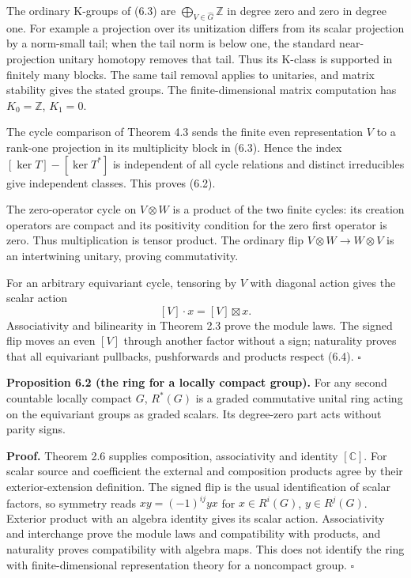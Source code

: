 \documentclass[
  11pt,
]{article}
\begin{document}
The ordinary K-groups of (6.3) are
\(\bigoplus_{V\in\widehat G}\mathbb Z\) in degree zero and zero in
degree one. For example a projection over its unitization differs from
its scalar projection by a norm-small tail; when the tail norm is below
one, the standard near-projection unitary homotopy removes that tail.
Thus its K-class is supported in finitely many blocks. The same tail
removal applies to unitaries, and matrix stability gives the stated
groups. The finite-dimensional matrix computation has \(K_0=\mathbb Z\),
\(K_1=0\).

The cycle comparison of Theorem 4.3 sends the finite even representation
\(V\) to a rank-one projection in its multiplicity block in (6.3). Hence
the index \([\ker T]-[\ker T^*]\) is independent of all cycle relations
and distinct irreducibles give independent classes. This proves (6.2).

The zero-operator cycle on \(V\otimes W\) is a product of the two finite
cycles: its creation operators are compact and its positivity condition
for the zero first operator is zero. Thus multiplication is tensor
product. The ordinary flip \(V\otimes W\to W\otimes V\) is an
intertwining unitary, proving commutativity.

For an arbitrary equivariant cycle, tensoring by \(V\) with diagonal
action gives the scalar action \[
[V]\cdot x=[V]\boxtimes x.
\tag{6.4}
\] Associativity and bilinearity in Theorem 2.3 prove the module laws.
The signed flip moves an even \([V]\) through another factor without a
sign; naturality proves that all equivariant pullbacks, pushforwards and
products respect (6.4). \(\square\)

\textbf{Proposition 6.2 (the ring for a locally compact group).} For any
second countable locally compact \(G\), \(R^*(G)\) is a graded
commutative unital ring acting on the equivariant groups as graded
scalars. Its degree-zero part acts without parity signs.

\textbf{Proof.} Theorem 2.6 supplies composition, associativity and
identity \([\mathbb C]\). For scalar source and coefficient the external
and composition products agree by their exterior-extension definition.
The signed flip is the usual identification of scalar factors, so
symmetry reads \(xy=(-1)^{ij}yx\) for \(x\in R^i(G)\), \(y\in R^j(G)\).
Exterior product with an algebra identity gives its scalar action.
Associativity and interchange prove the module laws and compatibility
with products, and naturality proves compatibility with algebra maps.
This does not identify the ring with finite-dimensional representation
theory for a noncompact group. \(\square\)
\end{document}
